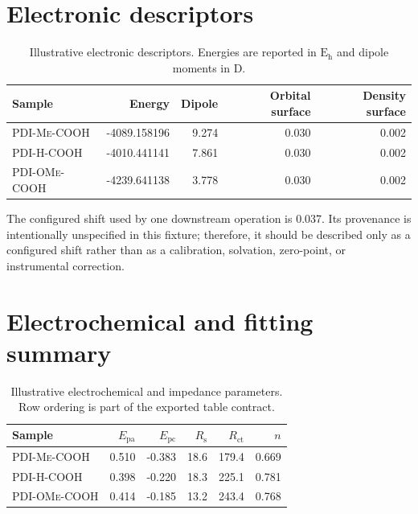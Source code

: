 \documentclass[10pt]{article}
\newcommand{\SampleMe}{\textsc{PDI-Me-COOH}}
\newcommand{\SampleH}{\textsc{PDI-H-COOH}}
\newcommand{\SampleOMe}{\textsc{PDI-OMe-COOH}}
\newcommand{\configuredshift}{0.037}
\newcommand{\orbitaliso}{0.030}
\newcommand{\densityiso}{0.002}
\newcommand{\energyunit}{\ensuremath{\mathrm{E_h}}}
\newcommand{\dipoleunit}{D}
\newenvironment{compacttable}
  {\begingroup\setlength{\tabcolsep}{4pt}\renewcommand{\arraystretch}{1.05}}
  {\endgroup}
\begin{document}
\section{Electronic descriptors}
\label{sec:descriptors}

\begin{compacttable}
\begin{table}[ht]
\centering
\caption{Illustrative electronic descriptors. Energies are reported in \energyunit{} and dipole moments in \dipoleunit{}.}
\label{tab:descriptors}
\begin{tabular}{lrrrr}
\toprule
Sample & Energy & Dipole & Orbital surface & Density surface \\
\midrule
\SampleMe   & -4089.158196 & 9.274 & \orbitaliso & \densityiso \\
\SampleH    & -4010.441141 & 7.861 & \orbitaliso & \densityiso \\
\SampleOMe  & -4239.641138 & 3.778 & \orbitaliso & \densityiso \\
\bottomrule
\end{tabular}
\end{table}
\end{compacttable}

The configured shift used by one downstream operation is \configuredshift{}. Its provenance is intentionally unspecified in this fixture; therefore, it should be described only as a configured shift rather than as a calibration, solvation, zero-point, or instrumental correction.

\section{Electrochemical and fitting summary}
\label{sec:electrochem}

\begin{compacttable}
\begin{table}[ht]
\centering
\caption{Illustrative electrochemical and impedance parameters. Row ordering is part of the exported table contract.}
\label{tab:electrochem}
\begin{tabular}{lrrrrr}
\toprule
Sample & $E_{\mathrm{pa}}$ & $E_{\mathrm{pc}}$ & $R_{\mathrm{s}}$ & $R_{\mathrm{ct}}$ & $n$ \\
\midrule
\SampleMe  & 0.510 & -0.383 & 18.6 & 179.4 & 0.669 \\
\SampleH   & 0.398 & -0.220 & 18.3 & 225.1 & 0.781 \\
\SampleOMe & 0.414 & -0.185 & 13.2 & 243.4 & 0.768 \\
\bottomrule
\end{tabular}
\end{table}
\end{compacttable}
\end{document}
